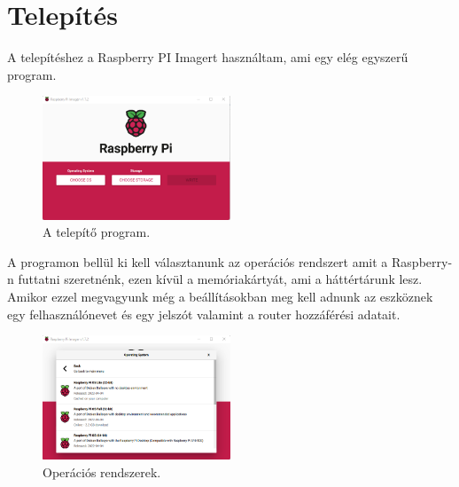 \documentclass[a4paper,12pt,oneside]{report}
\begin{document}








\chapter{Telepítés}

A telepítéshez a Raspberry PI Imagert használtam, ami egy elég egyszerű program.

\begin{figure}[htbp]
	\centering
	\includegraphics[width=0.5\textwidth]{fig/Imager.png}
	\caption{A telepítő program.}
	\label{fig-Imager}
\end{figure}

A programon bellül ki kell választanunk az operációs rendszert amit a Raspberry-n futtatni szeretnénk, ezen kívül a memóriakártyát, 
ami a háttértárunk lesz. Amikor ezzel megvagyunk még a beállításokban meg kell adnunk az eszköznek egy felhasználónevet és egy jelszót
valamint a router hozzáférési adatait.

\begin{figure}[htbp]
	\centering
	\includegraphics[width=0.5\textwidth]{fig/os.png}
	\caption{Operációs rendszerek.}
	\label{fig-os}
\end{figure}
\end{document}
